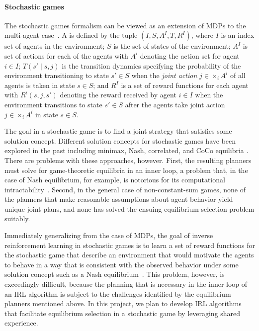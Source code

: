 
\vspace{\up}
\paragraph{Stochastic games}

The stochastic games formalism can be viewed as an extension of MDPs
to the multi-agent case~\cite{littman1994markov}. 
A  is defined by the tuple $(I, S, A^I, T,
R^I)$, where $I$ is an index set of agents in the environment; $S$ is
the set of states of the environment; $A^I$ is set of actions for each
of the agents with $A^i$ denoting the action set for agent $i \in I$;
$T(s' \mid s, j)$ is the transition dynamics specifying the
probability of the environment transitioning to state $s' \in S$ when
the {\em joint action} $j \in \times_i A^i$ of all agents is taken in
state $s \in S$; and $R^I$ is a set of reward functions for each agent
with $R^i(s, j, s')$ denoting the reward received by agent $i \in I$
when the environment transitions to state $s' \in S$ after the agents
take joint action $j \in \times_i A^i$ in state $s \in S$.

The goal in a stochastic game is to find a joint strategy that
satisfies some solution concept. Different solution concepts for
stochastic games have been explored in the past including minimax,
Nash, correlated, and CoCo equilibria
\cite{GreenwaldHall:03,HuWellman03,Littman01,ZGL:06}. There are
problems with these approaches, however. First, the resulting planners
must solve for game-theoretic equilibria in an inner loop, a problem
that, in the case of Nash equilibrium, for example, is notorious for
its computational
intractability~\cite{daskalakis2009complexity}. Second, in the general
case of non-constant-sum games, none of the planners that make
reasonable assumptions about agent behavior yield unique joint plans,
and none has solved the ensuing equilibrium-selection problem
suitably.

Immediately generalizing from the case of MDPs, the goal of inverse
reinforcement learning in stochastic games is to learn a set of reward
functions for the stochastic game that describe an environment that
would motivate the agents to behave in a way that is consistent with
the observed behavior under some solution concept such as a Nash
equilibrium~\cite{reddy2012inverse}.  This problem, however, is
exceedingly difficult, because the planning that is necessary in the
inner loop of an IRL algorithm is subject to the challenges identified
by the equilibrium planners mentioned above.
%
In this project, we plan to develop IRL algorithms that facilitate
equilibrium selection in a stochastic game by leveraging shared experience.
